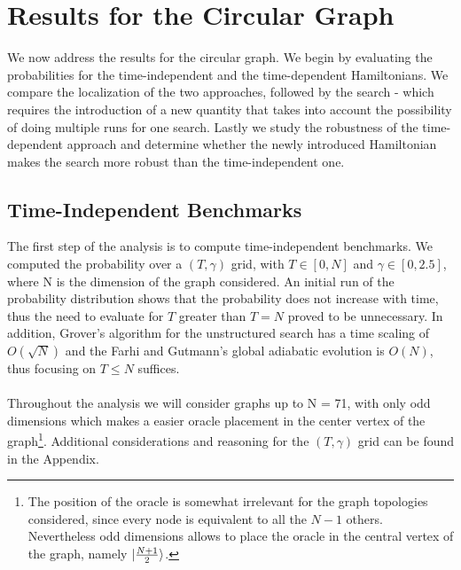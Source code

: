\section{Results for the Circular Graph}
We now address the results for the circular graph. We begin by evaluating the probabilities for the time-independent and the time-dependent Hamiltonians. We compare the localization of the two approaches, followed by the search - which requires the introduction of a new quantity that takes into account the possibility of doing multiple runs for one search. Lastly we study the robustness of the time-dependent approach and determine whether the newly introduced Hamiltonian makes the search more robust than the time-independent one.

    \subsection{Time-Independent Benchmarks}
        The first step of the analysis is to compute time-independent benchmarks. We computed the probability over a $(T,\gamma)$ grid, with $T\in[0,N]$ and $\gamma\in[0,2.5]$, where N is the dimension of the graph considered. An initial run of the probability distribution shows that the probability does not increase with time, thus the need to evaluate for $T$ greater than $T=N$ proved to be unnecessary. In addition, Grover's algorithm for the unstructured search has a time scaling of $O(\sqrt{N})$ and the Farhi and Gutmann's global adiabatic evolution is $O(N)$, thus focusing on $T \leq N$ suffices.\\
         \\
        Throughout the analysis we will consider graphs up to N = 71, with only odd dimensions which makes a easier oracle placement in the center vertex of the graph\footnote{The position of the oracle is somewhat irrelevant for the graph topologies considered, since every node is equivalent to all the $N-1$ others. Nevertheless odd dimensions allows to place the oracle in the central vertex of the graph, namely ${|{\frac{N+1}{2}}\rangle}$.}. Additional considerations and reasoning for the $(T,\gamma)$ grid can be found in the Appendix. \\


